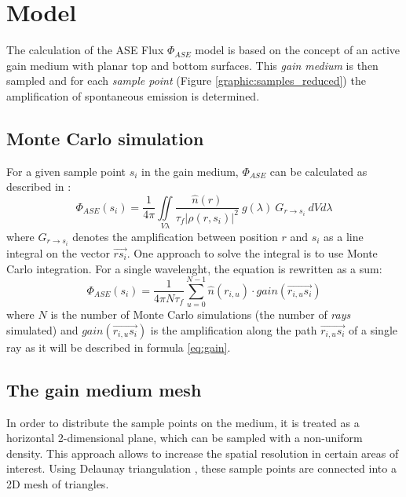 \section{Model}

The calculation of the ASE Flux $\Phi_{ASE}$ model is based on the concept of an
active gain medium with planar top and bottom surfaces. This \emph{gain medium} is
then sampled and for each \emph{sample point} (Figure
\ref{graphic:samples_reduced}) the amplification of spontaneous emission is
determined. 


\subsection{Monte Carlo simulation}
\label{subsec:monteCarlo}

For a given sample point $s_i$ in the gain medium, $\Phi_{ASE}$ can
be calculated as described in \cite{ASE2010}:
\begin{equation}
  \label{eq:phi_ase_daniel} 
  \Phi_{ASE}(s_i)=\frac{1}{4\pi}\iint\limits_{V \lambda}
  \frac
    {\hat{n}(r)}
    {\tau_{f}|\rho(r,s_i)|^2}
  ~g(\lambda)
  ~G_{r\rightarrow s_i}
  ~dV d\lambda
\end{equation}
where $G_{r\rightarrow s_i}$ denotes the amplification between
position $r$ and $s_i$ as a line integral on the vector
$\overrightarrow{rs_i}$.  One approach to solve the integral is to use Monte
Carlo integration. For a single wavelenght, the equation is rewritten as a sum:
\begin{equation}
  \label{eq:monte_carlo_ase}
  \Phi_{ASE}(s_i) = 
  \frac{1}{4\pi N\tau_f}
  \sum^{N-1}_{u=0} \hat{n}(r_{i,u}) \cdot gain(\overrightarrow{r_{i,u}s_i})
\end{equation}
where $N$ is the number of Monte Carlo simulations (the number of \emph{rays}
simulated) and $gain(\overrightarrow{r_{i,u}s_i})$ is the amplification along the
path $\overrightarrow{r_{i,u}s_i}$ of a single ray as it will be described in
formula \eqref{eq:gain}. 


\subsection{The gain medium mesh} \label{subsec:meshSampling}

In order to distribute the sample points on the medium, it is treated as
a horizontal 2-dimensional plane, which can be sampled with a non-uniform
density. This approach allows to increase the spatial resolution in certain
areas of interest. Using Delaunay triangulation \cite{delaunay_triangulation},
these sample points are connected into a 2D mesh of triangles.

